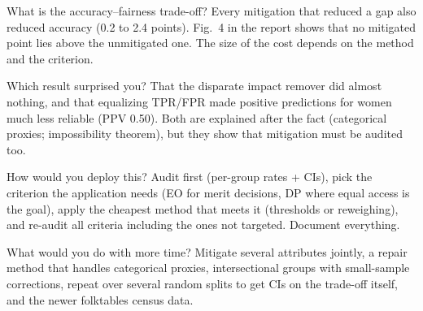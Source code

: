 \documentclass[11pt,a4paper]{article}
\begin{document}
\begin{qa}{What is the accuracy--fairness trade-off?}
Every mitigation that reduced a gap also reduced accuracy (0.2 to 2.4 points). Fig.~4 in the report shows that no mitigated point lies above the unmitigated one. The size of the cost depends on the method and the criterion.
\end{qa}
\begin{qa}{Which result surprised you?}
That the disparate impact remover did almost nothing, and that equalizing TPR/FPR made positive predictions for women much less reliable (PPV 0.50). Both are explained after the fact (categorical proxies; impossibility theorem), but they show that mitigation must be audited too.
\end{qa}
\begin{qa}{How would you deploy this?}
Audit first (per-group rates + CIs), pick the criterion the application needs (EO for merit decisions, DP where equal access is the goal), apply the cheapest method that meets it (thresholds or reweighing), and re-audit all criteria including the ones not targeted. Document everything.
\end{qa}
\begin{qa}{What would you do with more time?}
Mitigate several attributes jointly, a repair method that handles categorical proxies, intersectional groups with small-sample corrections, repeat over several random splits to get CIs on the trade-off itself, and the newer folktables census data.
\end{qa}
\end{document}
